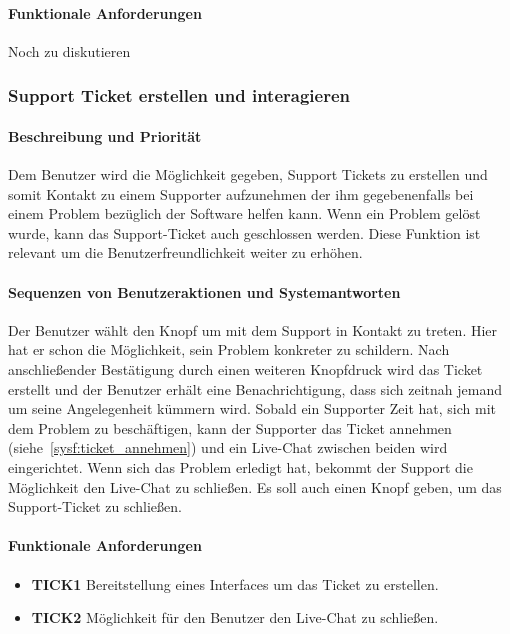\paragraph{Funktionale Anforderungen}
Noch zu diskutieren



\subsubsection{Support Ticket erstellen und interagieren}
\label{sysf:ticket_erstellen}
\paragraph{Beschreibung und Priorität}
Dem Benutzer wird die Möglichkeit gegeben, Support Tickets zu erstellen und somit Kontakt zu einem Supporter aufzunehmen
der ihm gegebenenfalls bei einem Problem bezüglich der Software helfen kann.
Wenn ein Problem gelöst wurde, kann das Support-Ticket auch geschlossen werden.
Diese Funktion ist relevant um die Benutzerfreundlichkeit weiter zu erhöhen.
\paragraph{Sequenzen von Benutzeraktionen und Systemantworten}
Der Benutzer wählt den Knopf  um mit dem Support in Kontakt zu treten.
Hier hat er schon die Möglichkeit, sein Problem konkreter zu schildern.
Nach anschließender Bestätigung durch einen weiteren Knopfdruck wird das Ticket erstellt
und der Benutzer erhält eine Benachrichtigung, dass sich zeitnah jemand um seine Angelegenheit kümmern wird.
Sobald ein Supporter Zeit hat, sich mit dem Problem zu beschäftigen, kann der Supporter das Ticket annehmen (siehe~\ref{sysf:ticket_annehmen})
und ein Live-Chat zwischen beiden wird eingerichtet.
Wenn sich das Problem erledigt hat, bekommt der Support die Möglichkeit den Live-Chat zu schließen.
Es soll auch einen Knopf geben, um das Support-Ticket zu schließen.
\paragraph{Funktionale Anforderungen}
\begin{itemize}
	\item \textbf{TICK1} Bereitstellung eines Interfaces um das Ticket zu erstellen.
	\item \textbf{TICK2} Möglichkeit für den Benutzer den Live-Chat zu schließen.
\end{itemize}

